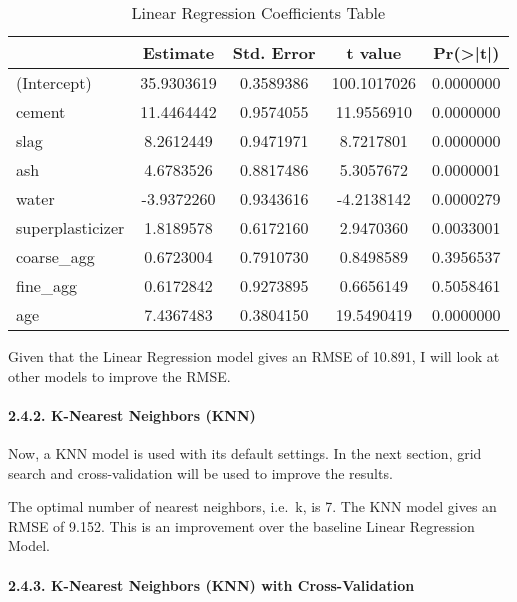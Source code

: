\documentclass[
]{article}
\begin{document}
\begin{table}[H]

\caption{\label{tab:Linear Regression Coefficients Table}Linear Regression Coefficients Table}
\centering
\fontsize{11}{13}\selectfont
\begin{tabular}[t]{|>{}l|||>{}c|||>{}c|||>{}c|||>{}c|}
\hline
  & Estimate & Std. Error & t value & Pr(>|t|)\\
\hline
(Intercept) & 35.9303619 & 0.3589386 & 100.1017026 & 0.0000000\\
\hline
cement & 11.4464442 & 0.9574055 & 11.9556910 & 0.0000000\\
\hline
slag & 8.2612449 & 0.9471971 & 8.7217801 & 0.0000000\\
\hline
ash & 4.6783526 & 0.8817486 & 5.3057672 & 0.0000001\\
\hline
water & -3.9372260 & 0.9343616 & -4.2138142 & 0.0000279\\
\hline
superplasticizer & 1.8189578 & 0.6172160 & 2.9470360 & 0.0033001\\
\hline
coarse\_agg & 0.6723004 & 0.7910730 & 0.8498589 & 0.3956537\\
\hline
fine\_agg & 0.6172842 & 0.9273895 & 0.6656149 & 0.5058461\\
\hline
age & 7.4367483 & 0.3804150 & 19.5490419 & 0.0000000\\
\hline
\end{tabular}
\end{table}

Given that the Linear Regression model gives an RMSE of 10.891, I will
look at other models to improve the RMSE.

\hypertarget{k-nearest-neighbors-knn}{%
\paragraph{2.4.2. K-Nearest Neighbors
(KNN)}\label{k-nearest-neighbors-knn}}

\hfill\break
Now, a KNN model is used with its default settings. In the next section,
grid search and cross-validation will be used to improve the results.

The optimal number of nearest neighbors, i.e.~k, is 7. The KNN model
gives an RMSE of 9.152. This is an improvement over the baseline Linear
Regression Model.

\hypertarget{k-nearest-neighbors-knn-with-cross-validation}{%
\paragraph{2.4.3. K-Nearest Neighbors (KNN) with
Cross-Validation}\label{k-nearest-neighbors-knn-with-cross-validation}}
\end{document}
